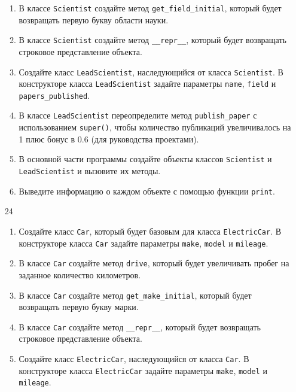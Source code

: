 \begin{enumerate}
\begin{enumerate}
    \item В классе \texttt{Scientist} создайте метод \texttt{get\_field\_initial}, который будет возвращать первую букву области науки.
    
    \item В классе \texttt{Scientist} создайте метод \texttt{\_\_repr\_\_}, который будет возвращать строковое представление объекта.
    
    \item Создайте класс \texttt{LeadScientist}, наследующийся от класса \texttt{Scientist}. В конструкторе класса \texttt{LeadScientist} задайте параметры \texttt{name}, \texttt{field} и \texttt{papers\_published}.
    
    \item В классе \texttt{LeadScientist} переопределите метод \texttt{publish\_paper} с использованием \texttt{super()}, чтобы количество публикаций увеличивалось на 1 плюс бонус в 0.6 (для руководства проектами).
    
    \item В основной части программы создайте объекты классов \texttt{Scientist} и \texttt{LeadScientist} и вызовите их методы.
    
    \item Выведите информацию о каждом объекте с помощью функции \texttt{print}.
\end{enumerate}

\item[24] 
\begin{enumerate}
    \item Создайте класс \texttt{Car}, который будет базовым для класса \texttt{ElectricCar}. В конструкторе класса \texttt{Car} задайте параметры \texttt{make}, \texttt{model} и \texttt{mileage}.
    
    \item В классе \texttt{Car} создайте метод \texttt{drive}, который будет увеличивать пробег на заданное количество километров.
    
    \item В классе \texttt{Car} создайте метод \texttt{get\_make\_initial}, который будет возвращать первую букву марки.
    
    \item В классе \texttt{Car} создайте метод \texttt{\_\_repr\_\_}, который будет возвращать строковое представление объекта.
    
    \item Создайте класс \texttt{ElectricCar}, наследующийся от класса \texttt{Car}. В конструкторе класса \texttt{ElectricCar} задайте параметры \texttt{make}, \texttt{model} и \texttt{mileage}.
    

\end{enumerate}
\end{enumerate}
